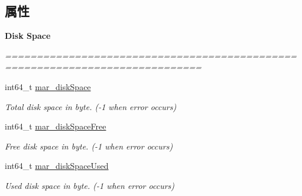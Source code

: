 \subsection*{属性}
\begin{Indent}\textbf{ Disk Space}\par
{\em ============================================================================= 

 }\begin{DoxyCompactItemize}
\item 
int64\+\_\+t \hyperlink{category_u_i_device_07_m_a_r_e_x_08_a4b43f881dc24e91bf039b2c46380b31a}{mar\+\_\+disk\+Space}
\begin{DoxyCompactList}\small\item\em Total disk space in byte. (-\/1 when error occurs) \end{DoxyCompactList}\item 
int64\+\_\+t \hyperlink{category_u_i_device_07_m_a_r_e_x_08_a759041f115b7d753ce97985ad05923bb}{mar\+\_\+disk\+Space\+Free}
\begin{DoxyCompactList}\small\item\em Free disk space in byte. (-\/1 when error occurs) \end{DoxyCompactList}\item 
int64\+\_\+t \hyperlink{category_u_i_device_07_m_a_r_e_x_08_aa5c34f39c6bd898fb50fc6ab84448cfc}{mar\+\_\+disk\+Space\+Used}
\begin{DoxyCompactList}\small\item\em Used disk space in byte. (-\/1 when error occurs) \end{DoxyCompactList}\end{DoxyCompactItemize}
\end{Indent}
